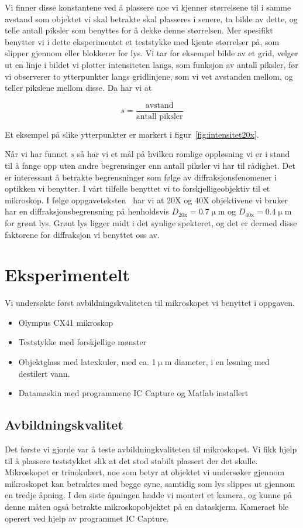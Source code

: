 \documentclass[a4paper,11pt, twocolumn]{article}
\begin{document}
Vi finner disse konstantene ved å plassere noe vi kjenner størrelsene til i samme avstand som objektet vi skal betrakte skal plasseres i senere, ta bilde av dette, og telle antall piksler som benyttes for å dekke denne størrelsen. Mer spesifikt benytter vi i dette eksperimentet et teststykke med kjente størrelser på, som slipper gjennom eller blokkerer for lys. Vi tar for eksempel bilde av et grid, velger ut en linje i bildet vi plotter intensiteten langs, som funksjon av antall piksler, før vi observerer to ytterpunkter langs gridlinjene, som vi vet avstanden mellom, og teller pikslene mellom disse. Da har vi at 

\begin{equation}
	s=\frac{\text{avstand}}{\text{antall piksler}}
\end{equation}

Et eksempel på slike ytterpunkter er markert i figur~\ref{fig:intensitet20x}.

Når vi har funnet $s$ så har vi et mål på hvilken romlige oppløsning vi er i stand til å fange opp uten andre begrensinger enn antall piksler vi har til rådighet. Det er interessant å betrakte begrensninger som følge av diffraksjonsfenomener i optikken vi benytter. I vårt tilfelle benyttet vi to forskjelligeobjektiv til et mikroskop. I følge oppgaveteksten~\cite{Schroeder2000} har vi at 20X og 40X objektivene vi bruker har en diffraksjonsbegrensning på henholdsvis $D_{20\text{x}}=0.7\upmu\text{m}$ og $D_{40\text{x}}=0.4\upmu\text{m}$ for grønt lys. Grønt lys ligger midt i det synlige spekteret, og det er dermed disse faktorene for diffraksjon vi benyttet oss av. 
\section{Eksperimentelt}
Vi undersøkte først avbildningskvaliteten til mikroskopet vi benyttet i oppgaven. 
\begin{itemize}
	\item Olympus CX41 mikroskop
	\item Teststykke med forskjellige mønster
	\item Objektglass med latexkuler, med ca. 1$\upmu$m diameter, i en løsning med destilert vann.
	\item Datamaskin med programmene IC Capture og Matlab installert
\end{itemize}

\subsection{Avbildningskvalitet}
Det første vi gjorde var å teste avbildningkvaliteten til mikroskopet. Vi fikk hjelp til å plassere teststykket slik at det stod stabilt plassert der det skulle. Mikroskopet er trinokulært, noe som betyr at objektet vi undersøker gjennom mikroskopet kan betraktes med begge øyne, samtidig som lys slippes ut gjennom en tredje åpning. I den siste åpningen hadde vi montert et kamera, og kunne på denne måten også betrakte mikroskopobjektet på en dataskjerm. Kameraet ble operert ved hjelp av programmet IC Capture.
\end{document}

